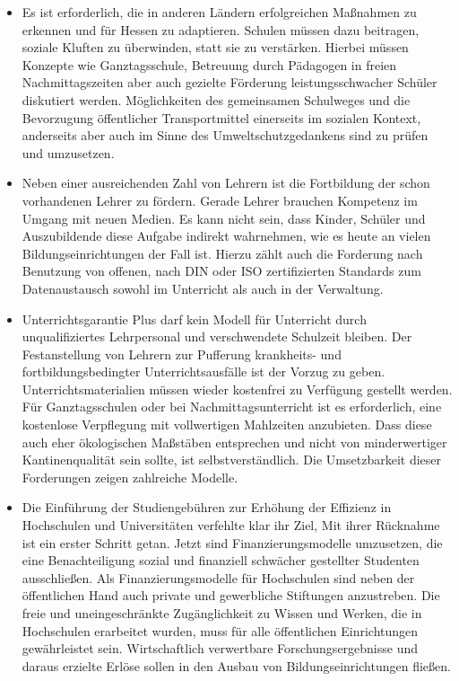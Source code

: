 \documentclass[10pt,a4paper,twocolumn,twoside,titlepage]{article}
\begin{document}
\begin{itemize}
\item Es ist erforderlich, die in anderen Ländern erfolgreichen Maßnahmen zu erkennen und für Hessen zu adaptieren. Schulen müssen dazu beitragen, soziale Kluften zu überwinden, statt sie zu verstärken. Hierbei müssen Konzepte wie Ganztagsschule, Betreuung durch Pädagogen in freien Nachmittagszeiten aber auch gezielte Förderung leistungsschwacher Schüler diskutiert werden. Möglichkeiten des gemeinsamen Schulweges und die Bevorzugung öffentlicher Transportmittel einerseits im sozialen Kontext, anderseits aber auch im Sinne des Umweltschutzgedankens sind zu prüfen und umzusetzen.
\item Neben einer ausreichenden Zahl von Lehrern ist die Fortbildung der schon vorhandenen Lehrer zu fördern. Gerade Lehrer brauchen Kompetenz im Umgang mit neuen Medien. Es kann nicht sein, dass Kinder, Schüler und Auszubildende diese Aufgabe indirekt wahrnehmen, wie es heute an vielen Bildungseinrichtungen der Fall ist. Hierzu zählt auch die Forderung nach Benutzung von offenen, nach DIN oder ISO zertifizierten Standards zum Datenaustausch sowohl im Unterricht als auch in der Verwaltung.
\item Unterrichtsgarantie Plus darf kein Modell für Unterricht durch unqualifiziertes Lehrpersonal und verschwendete Schulzeit bleiben. Der Festanstellung von Lehrern zur Pufferung krankheits- und fortbildungsbedingter Unterrichtsausfälle ist der Vorzug zu geben. Unterrichtsmaterialien müssen wieder kostenfrei zu Verfügung gestellt werden. Für Ganztagsschulen oder bei Nachmittagsunterricht ist es erforderlich, eine kostenlose Verpflegung mit vollwertigen Mahlzeiten anzubieten. Dass diese auch eher ökologischen Maßstäben entsprechen und nicht von minderwertiger Kantinenqualität sein sollte, ist selbstverständlich. Die Umsetzbarkeit dieser Forderungen zeigen zahlreiche Modelle.
\item Die Einführung der Studiengebühren zur Erhöhung der Effizienz in Hochschulen und Universitäten verfehlte klar ihr Ziel, Mit ihrer Rücknahme ist ein erster Schritt getan. Jetzt sind Finanzierungsmodelle umzusetzen, die eine Benachteiligung sozial und finanziell schwächer gestellter Studenten ausschließen. Als Finanzierungsmodelle für Hochschulen sind neben der öffentlichen Hand auch private und gewerbliche Stiftungen anzustreben. Die freie und uneingeschränkte Zugänglichkeit zu Wissen und Werken, die in Hochschulen erarbeitet wurden, muss für alle öffentlichen Einrichtungen gewährleistet sein. Wirtschaftlich verwertbare Forschungsergebnisse und daraus erzielte Erlöse sollen in den Ausbau von Bildungseinrichtungen fließen.
\end{itemize}
\end{document}
